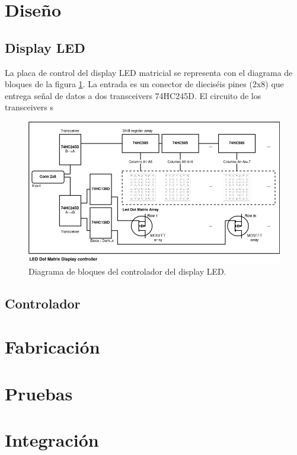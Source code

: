 \documentclass[
11pt, %
]{charter}
\begin{document}
\pagebreak

\section{Diseño}

\subsection{Display LED}
La placa de control del display LED matricial se representa con el diagrama de bloques de la figura \ref{fig:blockDiagram LED display}. La entrada es un conector de dieciséis pines (2x8) que entrega señal de datos a dos transceivers 74HC245D. El circuito de los transceivers s

\begin{figure}[htpb]
\centering 
\includegraphics[width=1\textwidth]{./Pics/blockDiagram.png}
\caption{Diagrama de bloques del controlador del display LED.}
\label{fig:blockDiagram LED display}
\end{figure}

\subsection{Controlador}

\section{Fabricación}
\section{Pruebas}
\section{Integración}
\end{document}
